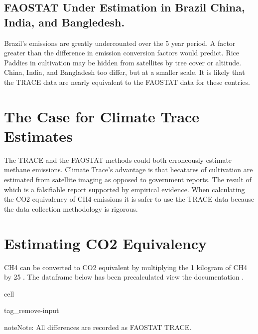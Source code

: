 \documentclass[letterpaper,10pt,english]{jupyterBook}
\begin{document}
\subsection{FAOSTAT Under Estimation in Brazil China, India, and Bangledesh.}
\label{\detokenize{notebooks/hidden_post:faostat-under-estimation-in-brazil-china-india-and-bangledesh}}
\sphinxAtStartPar
Brazil’s emissions are greatly undercounted over the 5 year period. A factor greater than the difference in emission conversion factors would predict.  Rice Paddies in cultivation may be hidden from satellites by tree cover or altitude.   China, India, and Bangladesh too differ, but at a smaller scale. It is likely that the TRACE data are nearly equivalent to the FAOSTAT data for these contries.


\section{The Case for Climate Trace Estimates}
\label{\detokenize{notebooks/hidden_post:the-case-for-climate-trace-estimates}}
\sphinxAtStartPar
The TRACE and the FAOSTAT methods could both erroneously estimate methane emissions.  Climate Trace’s advantage is that hecatares of cultivation are estimated from satellite imaging as opposed to government reports.  The result of which is a falsifiable report supported by empirical evidence. When calculating the CO2 equivalency of CH4 emissions it is safer to use the TRACE data because the data collection methodology is rigorous.


\section{Estimating CO2 Equivalency}
\label{\detokenize{notebooks/hidden_post:estimating-co2-equivalency}}
\sphinxAtStartPar
CH4 can be converted to CO2 equivalent by multiplying the 1 kilogram of CH4 by 25 .  The dataframe below has been precalculated view the documentation {\hyperref[\detokenize{notebooks/data_exploration:data-exploration-title}]{}}.

\begin{sphinxuseclass}{cell}
\begin{sphinxuseclass}{tag_remove-input}
\end{sphinxuseclass}
\end{sphinxuseclass}
\begin{sphinxadmonition}{note}{Note:}
\sphinxAtStartPar
All differences are recorded as FAOSTAT \sphinxhyphen{} TRACE.
\end{sphinxadmonition}
\end{document}
